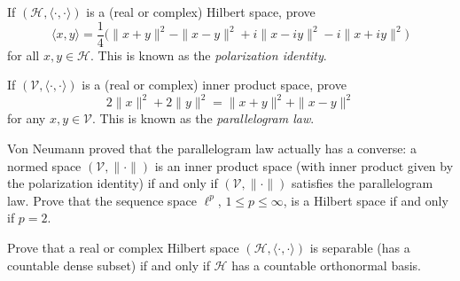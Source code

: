 \documentclass[12pt,letterpaper,cm]{hmcpset}
\begin{document}
\begin{problem}[1]
    If $(\mathcal{H},\langle\cdot,\cdot\rangle)$ is a (real or complex) Hilbert space, prove
    \[
        \langle x,y \rangle = \frac{1}{4}\bigl(\|x+y\|^2 - \|x-y\|^2 + i\|x-iy\|^2 - i\|x+iy\|^2\bigr)
    \]
    for all $x,y\in\mathcal{H}$. This is known as the \emph{polarization identity}.
\end{problem}

\begin{solution}
    \vfill
\end{solution}

\begin{problem}[2]
    If $(\mathcal{V},\langle\cdot,\cdot\rangle)$ is a (real or complex) inner product space, prove
    \[
        2\|x\|^2 + 2\|y\|^2 = \|x+y\|^2 + \|x-y\|^2
    \]
    for any $x,y\in\mathcal{V}$. This is known as the \emph{parallelogram law}.
\end{problem}

\begin{solution}
    \vfill
\end{solution}

\begin{problem}[3]
    Von Neumann proved that the parallelogram law actually has a converse: a normed
    space $(\mathcal{V},\|\cdot\|)$ is an inner product space (with inner product given
    by the polarization identity) if and only if $(\mathcal{V},\|\cdot\|)$ satisfies the
    parallelogram law. Prove that the sequence space $\ell^p$, $1\leq p \leq \infty$,
    is a Hilbert space if and only if $p=2$.
\end{problem}

\begin{solution}
    \vfill
\end{solution}

\begin{problem}[4]
    Prove that a real or complex Hilbert space $(\mathcal{H},\langle \cdot,\cdot \rangle)$ is separable
    (has a countable dense subset) if and only if $\mathcal{H}$ has a countable
    orthonormal basis.
\end{problem}

\begin{solution}
    \vfill
\end{solution}
\end{document}
